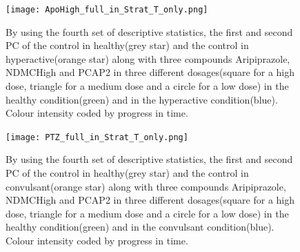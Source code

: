 \documentclass[a4paper,12pt]{article}
\begin{document}
\begin{figure}[h!]
\begin{center}
\texttt{[image: ApoHigh\_full\_in\_Strat\_T\_only.png]}
\caption{By using the fourth set of descriptive statistics, the first and second PC of the control in healthy(grey star) and the control in hyperactive(orange star) along with three compounds Aripiprazole, NDMCHigh and PCAP2 in three different dosages(square for a high dose, triangle for a medium dose and a circle for a low dose) in the healthy condition(green) and in the hyperactive condition(blue). Colour intensity coded by progress in time.}
\end{center}
\end{figure}

\begin{figure}[h!]
\begin{center}
\texttt{[image: PTZ\_full\_in\_Strat\_T\_only.png]}
\caption{By using the fourth set of descriptive statistics, the first and second PC of the control in healthy(grey star) and the control in convulsant(orange star) along with three compounds Aripiprazole, NDMCHigh and PCAP2 in three different dosages(square for a high dose, triangle for a medium dose and a circle for a low dose) in the healthy condition(green) and in the convulsant condition(blue). Colour intensity coded by progress in time.}
\end{center}
\end{figure}
\newpage
\end{document}
